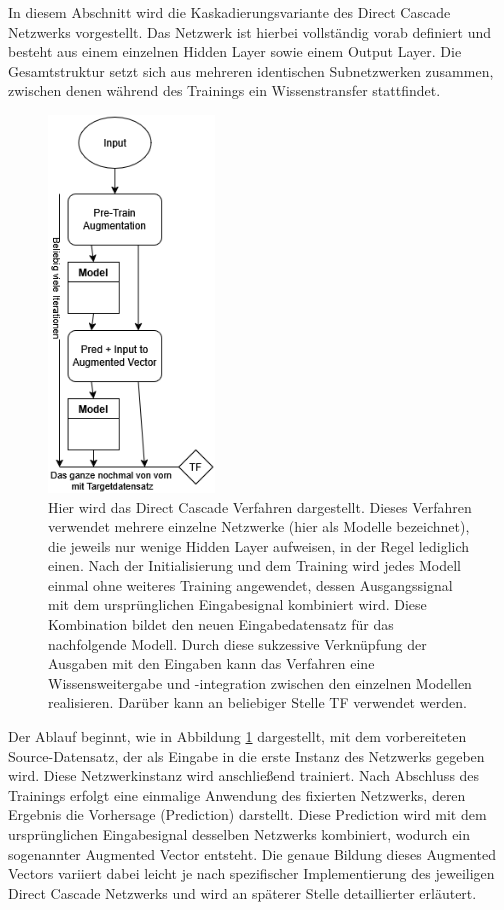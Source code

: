 In diesem Abschnitt wird die Kaskadierungsvariante des Direct Cascade Netzwerks vorgestellt. Das Netzwerk ist hierbei vollständig vorab 
definiert und besteht aus einem einzelnen Hidden Layer sowie einem Output Layer. Die Gesamtstruktur setzt sich aus mehreren identischen 
Subnetzwerken zusammen, zwischen denen während des Trainings ein Wissenstransfer stattfindet.

\begin{figure}[htpb]
    \centering
    \includegraphics[height=10cm]{../../Graphiken/direct_cascade.png}
    \caption{\label{fig:directcascade} 
    \small{Hier wird das Direct Cascade Verfahren dargestellt. Dieses Verfahren verwendet mehrere einzelne Netzwerke 
    (hier als Modelle bezeichnet), die jeweils nur wenige Hidden Layer aufweisen, in der Regel lediglich einen. Nach der 
    Initialisierung und dem Training wird jedes Modell einmal ohne weiteres Training angewendet, dessen Ausgangssignal mit dem ursprünglichen 
    Eingabesignal kombiniert wird. Diese Kombination bildet den neuen Eingabedatensatz für das nachfolgende Modell. Durch diese sukzessive 
    Verknüpfung der Ausgaben mit den Eingaben kann das Verfahren eine Wissensweitergabe und -integration zwischen den einzelnen Modellen 
    realisieren. Darüber kann an beliebiger Stelle TF verwendet werden.}}
\end{figure}

Der Ablauf beginnt, wie in Abbildung \ref{fig:directcascade} dargestellt, mit dem vorbereiteten Source-Datensatz, der als 
Eingabe in die erste Instanz des Netzwerks gegeben wird. Diese Netzwerkinstanz wird anschließend trainiert. Nach Abschluss des Trainings 
erfolgt eine einmalige Anwendung des fixierten Netzwerks, deren Ergebnis die Vorhersage (Prediction) darstellt. Diese Prediction wird mit 
dem ursprünglichen Eingabesignal desselben Netzwerks kombiniert, wodurch ein sogenannter Augmented Vector entsteht. Die genaue Bildung dieses 
Augmented Vectors variiert dabei leicht je nach spezifischer Implementierung des jeweiligen Direct Cascade Netzwerks und wird an späterer 
Stelle detaillierter erläutert.

